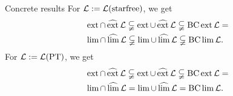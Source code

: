 \documentclass[
	handout,
	notheorems,noamsthm]{beamer}
\begin{document}

\begin{frame}[<+->]{Concrete results}
For $\Lang := \Lang(\mathtext{starfree})$, we get
\begin{align*}
& \ext \cap \dext \Lang \subsetneqq
\ext \cup \dext \Lang \subsetneqq
\BC \ext \Lang = \\
& \lim \cap \dlim \Lang \subsetneqq
\lim \cup \dlim \Lang \subsetneqq
\BC \lim \Lang .
\end{align*}
For $\Lang := \Lang(\PT)$, we get
\begin{align*}
& \ext \cap \dext \Lang \subsetneqq
\ext \cup \dext \Lang \subsetneqq
\BC \ext \Lang = \\
& \lim \cap \dlim \Lang =
\lim \cup \dlim \Lang =
\BC \lim \Lang .
\end{align*}
\end{frame}
\end{document}
